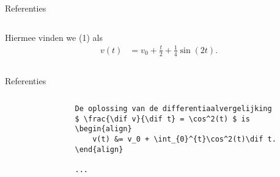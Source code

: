 \begin{frame}[fragile,t]{Referenties}
\begin{columns}[t]
\begin{column}{0.5\textwidth}
\begin{onlyenv}
\begin{adjustbox}{frame=1pt 10pt,valign=t}
\begin{minipage}{\textwidth-22pt}
{                            %
                            Hiermee vinden we (1) als
                            \begin{align*}
                                v(t) & = v_0 + \frac{t}{2} + \frac{1}{4}\sin(2t).
                            \end{align*}
                        }%
                    \end{minipage}
                \end{adjustbox}
            \end{onlyenv}%
        \end{column}
    \end{columns}
\end{frame}

\unless\ifishandout
\begin{frame}[fragile,t]{Referenties}
    \begin{columns}[t]
        \begin{column}{0.5\textwidth}%
            \begin{verbatim}
                De oplossing van de differentiaalvergelijking
                $ \frac{\dif v}{\dif t} = \cos^2(t) $ is
                \begin{align}
                    v(t) &= v_0 + \int_{0}^{t}\cos^2(t)\dif t.
                \end{align}

                ...


\end{verbatim}
\end{column}
\end{columns}
\end{frame}
